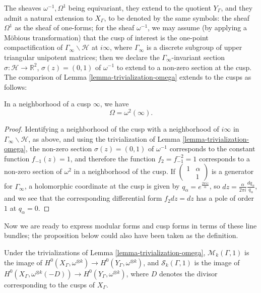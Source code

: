 The sheaves $\omega^{-1}, \Omega^1$ being equivariant, they extend to the quotient $Y_\Gamma$, and they admit a natural extension to $X_\Gamma$, to be denoted by the same symbols: the sheaf $\Omega^1$ as the sheaf of one-forms; for the sheaf $\omega^{-1}$, we may assume (by applying a M\"obious transformation) that the cusp of interest is the one-point compactification of $\Gamma_\infty\backslash \mathcal H$ at $i\infty$, where $\Gamma_\infty$ is a discrete subgroup of upper triangular unipotent matrices; then we declare the $\Gamma_\infty$-invariant section $\sigma: \mathcal H\to \mathbb R^2$, $\sigma(z) = (0,1)$ of $\omega^{-1}$ to extend to a non-zero section at the cusp. The comparison of Lemma \ref{lemma-trivialization-omega} extends to the cusps as follows:

\begin{lemma}
 \label{lemma-omega-Omega}
In a neighborhood of a cusp $\infty$, we have 
\begin{equation}
\label{equation-isomorphism-omega-Omega}
 \Omega = \omega^2(\infty).
\end{equation}
\end{lemma}

\begin{proof}
 Identifying a neighborhood of the cusp with a neighborhood of $i\infty$ in $\Gamma_\infty\backslash \mathcal H$, as above, and using the trivialization of Lemma \ref{lemma-trivialization-omega}, the non-zero section $\sigma(z) = (0,1)$ of $\omega^{-1}$ corresponds to the constant function $f_{-1}(z) = 1$, and therefore the function $f_2 = f_{-1}^{-2}= 1$ corresponds to a non-zero section of $\omega^2$ in a neighborhood of the cusp. If $\begin{pmatrix} 1 & \alpha \\ & 1\end{pmatrix}$ is a generator for $\Gamma_\infty$, a holomorphic coordinate at the cusp is given by $q_\alpha = e^{\frac{2\pi i z}{\alpha}}$, so $dz = \frac{\alpha}{2\pi i} \frac{dq_\alpha}{q_\alpha}$, and we see that the corresponding differential form $f_2 dz=dz$ has a pole of order $1$ at $q_\alpha = 0$.
\end{proof}

Now we are ready to express modular forms and cusp forms in terms of these line bundles; the proposition below could also have been taken as the definition.


\begin{proposition}
\label{proposition-modular-sections}
Under the trivializations of Lemma \ref{lemma-trivialization-omega}, $\mathcal{M}_k(\Gamma, 1)$ is the image of $H^{0}(X_{\Gamma}, \omega^{\otimes k}) \to H^{0}(Y_{\Gamma}, \omega^{\otimes k})$, and $\mathcal{S}_k(\Gamma, 1)$ is the image of $H^{0}(X_{\Gamma}, \omega^{\otimes k}(-D)) \to H^{0}(Y_{\Gamma}, \omega^{\otimes k})$, where 
	$D$ denotes the divisor corresponding to the cusps of $X_\Gamma$. 
\end{proposition}

